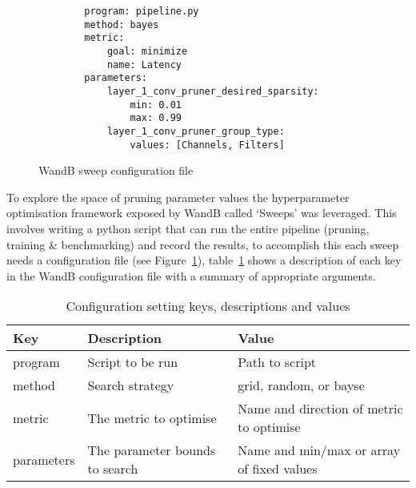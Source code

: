 \documentclass[../Dissertation.tex]{subfiles}
\begin{document}
\singlespacing
\begin{figure}[H]
    \begin{verbatim}
        program: pipeline.py
        method: bayes
        metric:
            goal: minimize
            name: Latency
        parameters:
            layer_1_conv_pruner_desired_sparsity:
                min: 0.01
                max: 0.99
            layer_1_conv_pruner_group_type:
                values: [Channels, Filters]
    \end{verbatim}
    \caption{WandB sweep configuration file}
    \label{fig:sweepConfig}
\end{figure}
\doublespacing

To explore the space of pruning parameter values the hyperparameter optimisation framework exposed by \acrshort{WandB} called `Sweeps' was leveraged. 
This involves writing a python script that can run the entire pipeline (pruning, training \& benchmarking) and record the results, to accomplish this each sweep needs a configuration file (see Figure~\ref{fig:sweepConfig}), table~\ref{tab:WandBConfig} shows a description of each key in the \acrshort{WandB} configuration file with a summary of appropriate arguments. 



\begin{table}[H]
    \begin{tabular}{@{}|l|l|l|@{}}
    \toprule
    Key        & Description                    & Value                                    \\ \midrule
    program    & Script to be run               & Path to script                           \\ \midrule
    method     & Search strategy                & grid, random, or bayse                   \\ \midrule
    metric     & The metric to optimise         & Name and direction of metric to optimise \\ \midrule
    parameters & The parameter bounds to search & Name and min/max or array of fixed values  \\ \bottomrule
    \end{tabular}
    \caption{Configuration setting keys, descriptions and values}
    \label{tab:WandBConfig}
\end{table}


\end{document}
